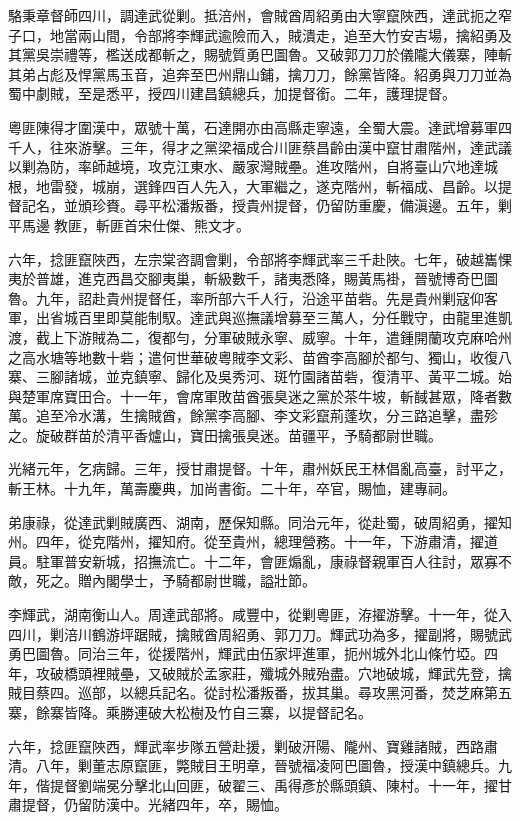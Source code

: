 \begin{pinyinscope}
駱秉章督師四川，調達武從剿。抵涪州，會賊酋周紹勇由大寧竄陜西，達武扼之窄子口，地當兩山間，令部將李輝武逾險而入，賊潰走，追至大竹安吉場，擒紹勇及其黨吳崇禮等，檻送成都斬之，賜號質勇巴圖魯。又破郭刀刀於儀隴大儀寨，陣斬其弟占彪及悍黨馬玉音，追奔至巴州鼎山鋪，擒刀刀，餘黨皆降。紹勇與刀刀並為蜀中劇賊，至是悉平，授四川建昌鎮總兵，加提督銜。二年，護理提督。

粵匪陳得才圍漢中，眾號十萬，石達開亦由高縣走寧遠，全蜀大震。達武增募軍四千人，往來游擊。三年，得才之黨梁福成合川匪蔡昌齡由漢中竄甘肅階州，達武議以剿為防，率師越境，攻克江東水、嚴家灣賊壘。進攻階州，自將臺山穴地達城根，地雷發，城崩，選鋒四百人先入，大軍繼之，遂克階州，斬福成、昌齡。以提督記名，並頒珍賚。尋平松潘叛番，授貴州提督，仍留防重慶，備滇邊。五年，剿平馬邊教匪，斬匪首宋仕傑、熊文才。

六年，捻匪竄陜西，左宗棠咨調會剿，令部將李輝武率三千赴陜。七年，破越巂惈夷於普雄，進克西昌交腳夷巢，斬級數千，諸夷悉降，賜黃馬褂，晉號博奇巴圖魯。九年，詔赴貴州提督任，率所部六千人行，沿途平苗砦。先是貴州剿寇仰客軍，出省城百里即莫能制馭。達武與巡撫議增募至三萬人，分任戰守，由龍里進凱渡，截上下游賊為二，復都勻，分軍破賊永寧、威寧。十年，遣鍾開蘭攻克麻哈州之高水塘等地數十砦；遣何世華破粵賊李文彩、苗酋李高腳於都勻、獨山，收復八寨、三腳諸城，並克鎮寧、歸化及吳秀河、斑竹園諸苗砦，復清平、黃平二城。始與楚軍席寶田合。十一年，會席軍敗苗酋張臭迷之黨於茶牛坡，斬馘甚眾，降者數萬。追至冷水溝，生擒賊酋，餘黨李高腳、李文彩竄荊蓬坎，分三路追擊，盡殄之。旋破群苗於清平香爐山，寶田擒張臭迷。苗疆平，予騎都尉世職。

光緒元年，乞病歸。三年，授甘肅提督。十年，肅州妖民王林倡亂高臺，討平之，斬王林。十九年，萬壽慶典，加尚書銜。二十年，卒官，賜恤，建專祠。

弟康祿，從達武剿賊廣西、湖南，歷保知縣。同治元年，從赴蜀，破周紹勇，擢知州。四年，從克階州，擢知府。從至貴州，總理營務。十一年，下游肅清，擢道員。駐軍普安新城，招撫流亡。十二年，會匪煽亂，康祿督親軍百人往討，眾寡不敵，死之。贈內閣學士，予騎都尉世職，謚壯節。

李輝武，湖南衡山人。周達武部將。咸豐中，從剿粵匪，洊擢游擊。十一年，從入四川，剿涪川鶴游坪踞賊，擒賊酋周紹勇、郭刀刀。輝武功為多，擢副將，賜號武勇巴圖魯。同治三年，從援階州，輝武由伍家坪進軍，扼州城外北山條竹埡。四年，攻破橋頭裡賊壘，又破賊於孟家莊，殲城外賊殆盡。穴地破城，輝武先登，擒賊目蔡四。巡部，以總兵記名。從討松潘叛番，拔其巢。尋攻黑河番，焚芝麻第五寨，餘寨皆降。乘勝連破大松樹及竹自三寨，以提督記名。

六年，捻匪竄陜西，輝武率步隊五營赴援，剿破汧陽、隴州、寶雞諸賊，西路肅清。八年，剿董志原竄匪，斃賊目王明章，晉號福凌阿巴圖魯，授漢中鎮總兵。九年，偕提督劉端冕分擊北山回匪，破翟三、禹得彥於縣頭鎮、陳村。十一年，擢甘肅提督，仍留防漢中。光緒四年，卒，賜恤。


\end{pinyinscope}

